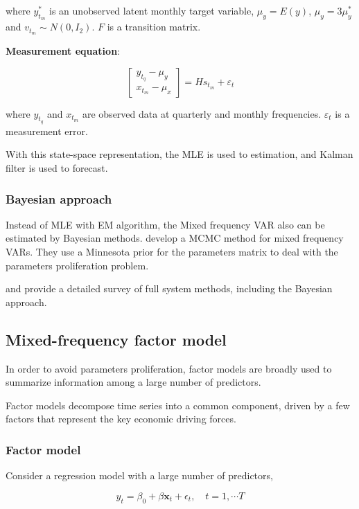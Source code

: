 where $y_{t_m}^*$ is an unobserved latent monthly target variable, $\mu_y= E(y)$, $\mu_y = 3 \mu_y^*$ and $v_{t_m} \sim N(0, I_2)$.  $F$ is a transition matrix. 


\textbf{Measurement equation}:

$$\begin{bmatrix} y_{t_q} - \mu_y \\ x_{t_m} - \mu_x\end{bmatrix}  = H s_{t_m} + \varepsilon_t$$

where $y_{t_q}$ and $x_{t_m}$ are observed data at quarterly and monthly frequencies. $\varepsilon_t$ is a measurement error.

With this state-space representation, the MLE is used to estimation, and Kalman filter is used to forecast.

\subsubsection{Bayesian approach}

Instead of MLE with EM algorithm, the Mixed frequency VAR also can be estimated by Bayesian methods.  develop a MCMC method for mixed frequency VARs. They use a Minnesota prior for the parameters matrix to deal with the parameters proliferation problem. 

  and    provide a detailed survey of full system methods, including the Bayesian approach.

\subsection{Mixed-frequency factor model}

In order to avoid parameters proliferation, factor models are  broadly used to summarize information among a large number of predictors.

Factor models decompose time series into a common component, driven by a few factors that represent the key economic driving forces. 

\subsubsection{Factor model}


Consider a regression model with a large number of predictors,

$$y_t = \beta_0 + \beta \mathbf x_t + \epsilon_t, \quad t = 1,\cdots T$$

